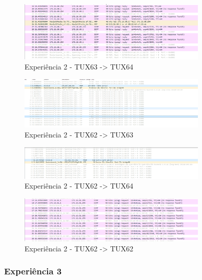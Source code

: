 \documentclass[11pt,a4paper]{article}
\begin{document}
\begin{figure}[H]
    \centering
    \includegraphics[width=0.8\textwidth]{images/exp2-ping3-4-broadcast.png}
    \caption{Experiência 2 - TUX63 -> TUX64}
\end{figure}

\begin{figure}[H]
    \centering
    \includegraphics[width=0.8\textwidth]{images/exp2-ping2-3-broadcast.png}
    \caption{Experiência 2 - TUX62 -> TUX63}
\end{figure}

\begin{figure}[H]
    \centering
    \includegraphics[width=0.8\textwidth]{images/exp2-ping2-4-broadcast.png}
    \caption{Experiência 2 - TUX62 -> TUX64}
\end{figure}

\begin{figure}[H]
    \centering
    \includegraphics[width=0.8\textwidth]{images/exp2-ping2-2-broadcast.png}
    \caption{Experiência 2 - TUX62 -> TUX62}
\end{figure}

\subsubsection{Experiência 3}
\end{document}
